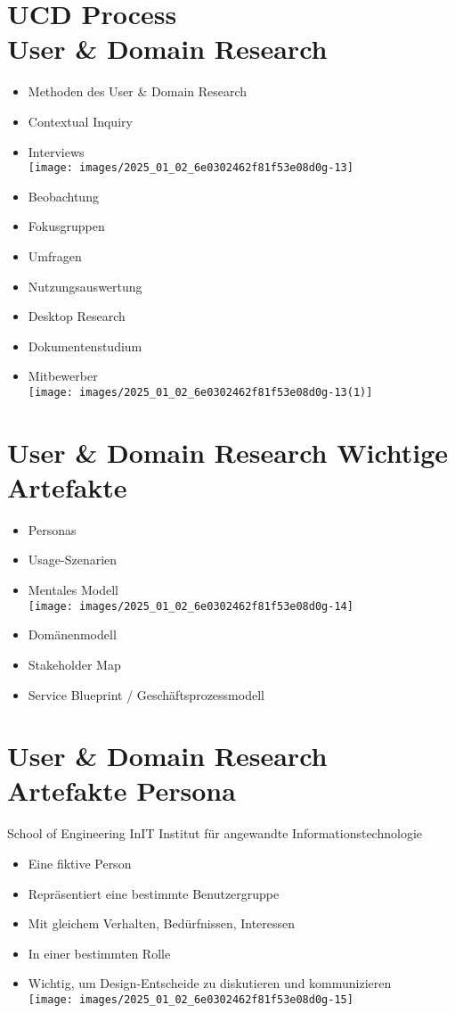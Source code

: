 \documentclass[10pt]{article}
\begin{document}
\section*{UCD Process \\
 User \& Domain Research}
\begin{itemize}
  \item Methoden des User \& Domain Research
  \item Contextual Inquiry
  \item Interviews\\
\texttt{[image: images/2025\_01\_02\_6e0302462f81f53e08d0g-13]}
  \item Beobachtung
  \item Fokusgruppen
  \item Umfragen
  \item Nutzungsauswertung
  \item Desktop Research
  \item Dokumentenstudium
  \item Mitbewerber\\
\texttt{[image: images/2025\_01\_02\_6e0302462f81f53e08d0g-13(1)]}
\end{itemize}

\section*{User \& Domain Research Wichtige Artefakte}
\begin{itemize}
  \item Personas
  \item Usage-Szenarien
  \item Mentales Modell\\
\texttt{[image: images/2025\_01\_02\_6e0302462f81f53e08d0g-14]}
  \item Domänenmodell
  \item Stakeholder Map
  \item Service Blueprint / Geschäftsprozessmodell
\end{itemize}

\section*{User \& Domain Research Artefakte Persona}
School of Engineering InIT Institut für angewandte Informationstechnologie

\begin{itemize}
  \item Eine fiktive Person
  \item Repräsentiert eine bestimmte Benutzergruppe
  \item Mit gleichem Verhalten, Bedürfnissen, Interessen
  \item In einer bestimmten Rolle
  \item Wichtig, um Design-Entscheide zu diskutieren und kommunizieren\\
\texttt{[image: images/2025\_01\_02\_6e0302462f81f53e08d0g-15]}
\end{itemize}
\end{document}

